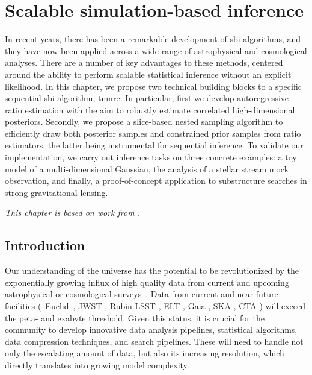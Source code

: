 
\chapter{Scalable simulation-based inference} \label{cha:anre}

In recent years, there has been a remarkable development of \gls*{sbi} algorithms, and they have now been applied across a wide range of astrophysical and cosmological analyses. There are a number of key advantages to these methods, centered around the ability to perform scalable statistical inference without an explicit likelihood. In this chapter, we propose two technical building blocks to a specific sequential \gls*{sbi} algorithm, \gls*{tmnre}. In particular, first we develop autoregressive ratio estimation with the aim to robustly estimate correlated high-dimensional posteriors. Secondly, we propose a slice-based nested sampling algorithm to efficiently draw both posterior samples and constrained prior samples from ratio estimators, the latter being instrumental for sequential inference. To validate our implementation, we carry out inference tasks on three concrete examples: a toy model of a multi-dimensional Gaussian, the analysis of a stellar stream mock observation, and finally, a proof-of-concept application to substructure searches in strong gravitational lensing. 

\textit{This chapter is based on work from \cite{AnauMontel:2023stj}.}


\section{Introduction} \label{sec:anre-intro}

Our understanding of the universe has the potential to be revolutionized by the exponentially growing influx of high quality data from current and upcoming astrophysical or cosmological surveys~\cite{DiValentino:2020vhf}. Data from current and near-future facilities (\eg~Euclid~\cite{EUCLID:2011zbd}, JWST \cite{Gardner:2006ky}, Rubin-LSST \cite{LSSTDarkEnergyScience:2012kar}, ELT \cite{Neichel:2018aa}, Gaia \cite{Prusti:2016aa}, SKA \cite{Lazio:2009aa}, CTA \cite{Knodlseder:2020onx}) will exceed the peta- and exabyte threshold. Given this status, it is crucial for the community to develop innovative data analysis pipelines, statistical algorithms, data compression techniques, and search pipelines. These will need to handle not only the escalating amount of data, but also its increasing resolution, which directly translates into growing model complexity.

